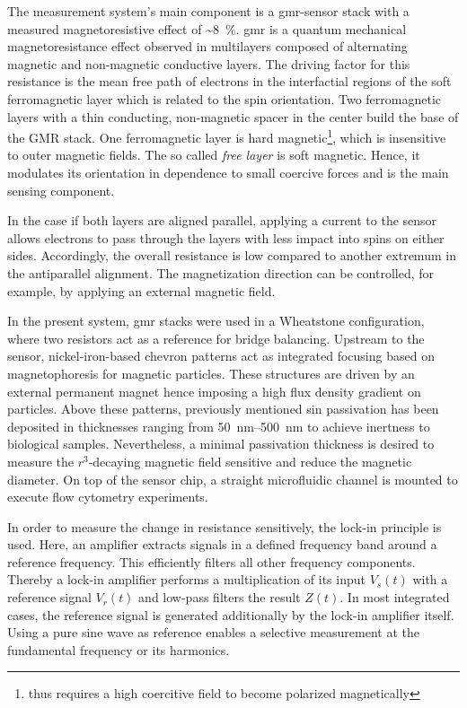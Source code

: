 The measurement system's main component is a \gls{gmr}-sensor stack with a measured magnetoresistive effect of \textasciitilde \SI{8}{\percent}. \gls{gmr} is a quantum mechanical magnetoresistance effect observed in multilayers composed of alternating magnetic and non-magnetic conductive layers. The driving factor for this resistance is the mean free path of electrons in the interfactial regions of the soft ferromagnetic layer which is related to the spin orientation. Two ferromagnetic layers with a thin conducting, non-magnetic spacer in the center build the base of the GMR stack.\cite{lit:nano:magnetism} One ferromagnetic layer is hard magnetic\footnote{thus requires a high coercitive field to become polarized magnetically}, which is insensitive to outer magnetic fields. The so called \textit{free layer} is soft magnetic. Hence, it modulates its orientation in dependence to small coercive forces and is the main sensing component. \cite{lit:nano:Guimares2017}

In the case if both layers are aligned parallel, applying a current to the sensor allows electrons to pass through the layers with less impact into spins on either sides. Accordingly, the overall resistance is low compared to another extremum in the antiparallel alignment. The magnetization direction can be controlled, for example, by applying an external magnetic field.\cite{lit:nano:physicsmagneticmaterials, lit:nano:GMRPatent} 

In the present system, \gls{gmr} stacks were used in a Wheatstone configuration, where two resistors act as a reference for bridge balancing. Upstream to the sensor, nickel-iron-based chevron patterns act as integrated focusing based on magnetophoresis for magnetic particles. These structures are driven by an external permanent magnet hence imposing a high flux density gradient on particles. Above these patterns, previously mentioned \gls{sin} passivation has been deposited in thicknesses ranging from \SIrange{50}{500}{\nano\meter} to achieve inertness to biological samples. Nevertheless, a minimal passivation thickness is desired to measure the $r^3$-decaying magnetic field sensitive and reduce the magnetic diameter. On top of the sensor chip, a straight microfluidic channel is mounted to execute flow cytometry experiments.\cite{lit:paperHelou,lit:paperReisbeck}

In order to measure the change in resistance sensitively, the lock-in principle is used. Here, an amplifier extracts signals in a defined frequency band around a reference frequency. This efficiently filters all other frequency components. Thereby a lock-in amplifier performs a multiplication of its input $V_s(t)$ with a reference signal $V_r(t)$ and low-pass filters the result $Z(t)$. In most integrated cases, the reference signal is generated additionally by the lock-in amplifier itself. Using a pure sine wave as reference enables a selective measurement at the fundamental frequency or its harmonics.\cite{lit:nano:lockin} 

